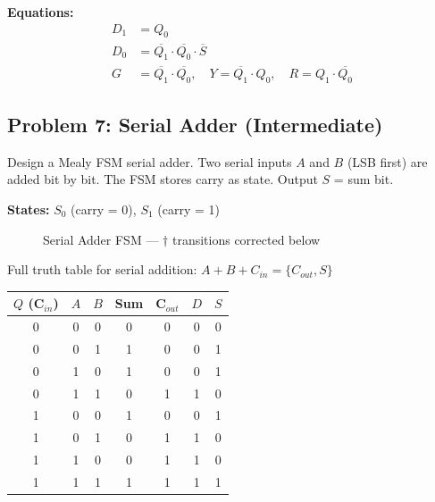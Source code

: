 \documentclass[12pt,a4paper]{article}
\begin{document}
\textbf{Equations:}
\begin{align}
D_1 &= Q_0 \\
D_0 &= \overline{Q_1} \cdot \overline{Q_0} \cdot \overline{S} \\
G &= \overline{Q_1} \cdot \overline{Q_0}, \quad Y = \overline{Q_1} \cdot Q_0, \quad R = Q_1 \cdot \overline{Q_0}
\end{align}


\subsection{Problem 7: Serial Adder (Intermediate)}

\begin{infobox}
Design a Mealy FSM serial adder. Two serial inputs $A$ and $B$ (LSB first) are added bit by bit. The FSM stores carry as state. Output $S$ = sum bit.
\end{infobox}

\textbf{States:} $S_0$ (carry = 0), $S_1$ (carry = 1)

\begin{figure}[H]
\centering
{}
\caption{Serial Adder FSM --- $\dagger$ transitions corrected below}
\end{figure}

Full truth table for serial addition: $A + B + C_{in} = \{C_{out}, S\}$

\begin{table}[H]
\centering
\begin{tabular}{ccc|cc|c|c}
\toprule
$Q$ (C$_{in}$) & $A$ & $B$ & Sum & C$_{out}$ & $D$ & $S$ \\
\midrule
0 & 0 & 0 & 0 & 0 & 0 & 0 \\
0 & 0 & 1 & 1 & 0 & 0 & 1 \\
0 & 1 & 0 & 1 & 0 & 0 & 1 \\
0 & 1 & 1 & 0 & 1 & 1 & 0 \\
1 & 0 & 0 & 1 & 0 & 0 & 1 \\
1 & 0 & 1 & 0 & 1 & 1 & 0 \\
1 & 1 & 0 & 0 & 1 & 1 & 0 \\
1 & 1 & 1 & 1 & 1 & 1 & 1 \\
\bottomrule
\end{tabular}
\end{table}
\end{document}
